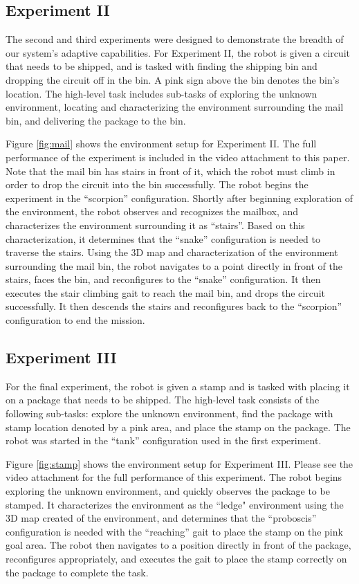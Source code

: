 \documentclass[conference]{IEEEtran}
\begin{document}
\subsection{Experiment II}

The second and third experiments were designed to demonstrate the breadth of our system's adaptive capabilities. For Experiment II, the robot is given a circuit that needs to be shipped, and is tasked with finding the shipping bin and dropping the circuit off in the bin. A pink sign above the bin denotes the bin's location. The high-level task includes sub-tasks of exploring the unknown environment, locating and characterizing the environment surrounding the mail bin, and delivering the package to the bin.

Figure \ref{fig:mail} shows the environment setup for Experiment II. The full performance of the experiment is included in the video attachment to this paper. Note that the mail bin has stairs in front of it, which the robot must climb in order to drop the circuit into the bin successfully. The robot begins the experiment in the ``scorpion'' configuration. Shortly after beginning exploration of the environment, the robot observes and recognizes the mailbox, and characterizes the environment surrounding it as ``stairs''. Based on this characterization, it determines that the ``snake'' configuration is needed to traverse the stairs. Using the 3D map and characterization of the environment surrounding the mail bin, the robot navigates to a point directly in front of the stairs, faces the bin, and reconfigures to the ``snake'' configuration. It then executes the stair climbing gait to reach the mail bin, and drops the circuit successfully. It then descends the stairs and reconfigures back to the ``scorpion'' configuration to end the mission.

\subsection{Experiment III}

For the final experiment, the robot is given a stamp and is tasked with placing it on a package that needs to be shipped. The high-level task consists of the following sub-tasks: explore the unknown environment, find the package with stamp location denoted by a pink area, and place the stamp on the package. The robot was started in the ``tank'' configuration used in the first experiment.

Figure \ref{fig:stamp} shows the environment setup for Experiment III. Please see the video attachment for the full performance of this experiment. The robot begins exploring the unknown environment, and quickly observes the package to be stamped. It characterizes the environment as the ``ledge" environment using the 3D map created of the environment, and determines that the ``proboscis'' configuration is needed with the ``reaching'' gait to place the stamp on the pink goal area. The robot then navigates to a position directly in front of the package, reconfigures appropriately, and executes the gait to place the stamp correctly on the package to complete the task.
\end{document}
